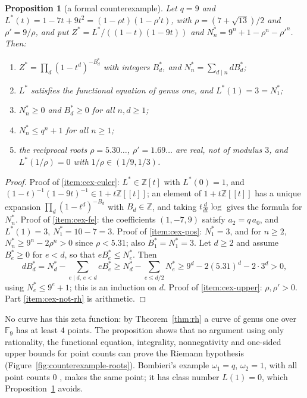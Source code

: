 \documentclass[11pt]{amsbook}
\theoremstyle{plain}
\newtheorem{proposition}[theorem]{Proposition}
\theoremstyle{definition}
\theoremstyle{remark}
\numberwithin{equation}{section}
\numberwithin{figure}{chapter}
\numberwithin{table}{chapter}
\newcommand{\Z}{\mathbb{Z}}
\newcommand{\F}{\mathbb{F}}
\begin{document}
\begin{proposition}[a formal counterexample]\label{prop:formal-cex}
Let $q=9$ and $L^*(t)=1-7t+9t^2=(1-\rho t)(1-\rho't)$, with
$\rho=(7+\sqrt{13})/2$ and $\rho'=9/\rho$, and put
$Z^*=L^*/((1-t)(1-9t))$ and $N_n^*=9^n+1-\rho^n-\rho'^n$. Then:
\begin{enumerate}
\item\label{item:cex-euler} $Z^*=\prod_d(1-t^d)^{-B_d^*}$ with
integers $B_d^*$, and $N_n^*=\sum_{d\mid n}dB_d^*$;
\item\label{item:cex-fe} $L^*$ satisfies the functional equation of
genus one, and $L^*(1)=3=N_1^*$;
\item\label{item:cex-pos} $N_n^*\ge0$ and $B_d^*\ge0$ for all
$n,d\ge1$;
\item\label{item:cex-upper} $N_n^*\le q^n+1$ for all $n\ge1$;
\item\label{item:cex-not-rh} the reciprocal roots
$\rho=5.30\ldots$, $\rho'=1.69\ldots$ are real, not of modulus $3$,
and $L^*(1/\rho)=0$ with $1/\rho\in(1/9,1/3)$.
\end{enumerate}
\end{proposition}

\begin{proof}
Proof of \eqref{item:cex-euler}: $L^*\in\Z[t]$ with $L^*(0)=1$, and
$(1-t)^{-1}(1-9t)^{-1}\in1+t\Z[[t]]$; an element of $1+t\Z[[t]]$
has a unique expansion $\prod_d(1-t^d)^{-B_d}$ with $B_d\in\Z$, and
taking $t\frac d{dt}\log$ gives the formula for $N_n^*$. Proof of
\eqref{item:cex-fe}: the coefficients $(1,-7,9)$ satisfy
$a_2=q\,a_0$, and $L^*(1)=3$, $N_1^*=10-7=3$. Proof of
\eqref{item:cex-pos}: $N_1^*=3$, and for $n\ge2$,
$N_n^*\ge9^n-2\rho^n>0$ since $\rho<5.31$; also
$B_1^*=N_1^*=3$. Let $d\ge2$ and assume $B_e^*\ge0$ for $e<d$, so
that $eB_e^*\le N_e^*$. Then
\[
dB_d^*=N_d^*-\sum_{e\mid d,\,e<d}eB_e^*
\ge N_d^*-\sum_{e\le d/2}N_e^*
\ge9^d-2(5.31)^d-2\cdot3^d>0,
\]
using $N_e^*\le9^e+1$; this is an induction on $d$. Proof of
\eqref{item:cex-upper}: $\rho,\rho'>0$. Part
\eqref{item:cex-not-rh} is arithmetic.
\end{proof}

No curve has this zeta function: by Theorem~\ref{thm:rh} a curve of
genus one over $\F_9$ has at least $4$ points. The proposition
shows that no argument using only rationality, the functional
equation, integrality, nonnegativity and one-sided upper bounds for
point counts can prove the Riemann hypothesis
(Figure~\ref{fig:counterexample-roots}). Bombieri's example
$\omega_1=q$, $\omega_2=1$, with all point counts $0$
\cite[p.~239]{Bombieri1974}, makes the same point; it has class
number $L(1)=0$, which Proposition~\ref{prop:formal-cex} avoids.
\end{document}
